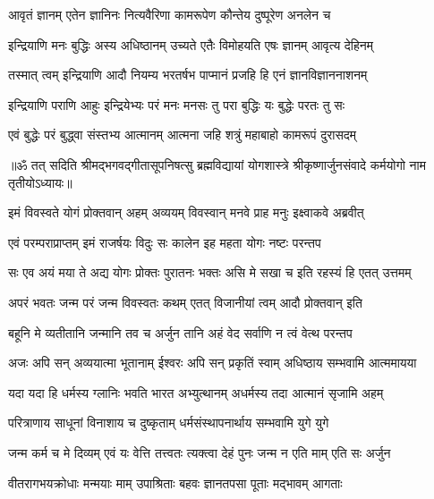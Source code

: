 \twolineshloka
{आवृतं ज्ञानम् एतेन ज्ञानिनः नित्यवैरिणा}
{कामरूपेण कौन्तेय दुष्पूरेण अनलेन च}%

\twolineshloka
{इन्द्रियाणि मनः बुद्धिः अस्य अधिष्ठानम् उच्यते}
{एतैः विमोहयति एषः ज्ञानम् आवृत्य देहिनम्}%

\twolineshloka
{तस्मात् त्वम् इन्द्रियाणि आदौ नियम्य भरतर्षभ}
{पाप्मानं प्रजहि हि एनं ज्ञानविज्ञाननाशनम्}%

\twolineshloka
{इन्द्रियाणि पराणि आहुः इन्द्रियेभ्यः परं मनः}
{मनसः तु परा बुद्धिः यः बुद्धेः परतः तु सः}%

\twolineshloka
{एवं बुद्धेः परं बुद्ध्वा संस्तभ्य आत्मानम् आत्मना}
{जहि शत्रुं महाबाहो कामरूपं दुरासदम्}%

{॥ॐ तत् सदिति श्रीमद्भगवद्गीतासूपनिषत्सु ब्रह्मविद्यायां योगशास्त्रे श्रीकृष्णार्जुनसंवादे कर्मयोगो नाम तृतीयोऽध्यायः॥}



\twolineshloka
{इमं विवस्वते योगं प्रोक्तवान् अहम् अव्ययम्}
{विवस्वान् मनवे प्राह मनुः इक्ष्वाकवे अब्रवीत्}%

\twolineshloka
{एवं परम्पराप्राप्तम् इमं राजर्षयः विदुः}
{सः कालेन इह महता योगः नष्टः परन्तप}%

\twolineshloka
{सः एव अयं मया ते अद्य योगः प्रोक्तः पुरातनः}
{भक्तः असि मे सखा च इति रहस्यं हि एतत् उत्तमम्}%


\twolineshloka
{अपरं भवतः जन्म परं जन्म विवस्वतः}
{कथम् एतत् विजानीयां त्वम् आदौ प्रोक्तवान् इति}%


\twolineshloka
{बहूनि मे व्यतीतानि जन्मानि तव च अर्जुन}
{तानि अहं वेद सर्वाणि न त्वं वेत्थ परन्तप}%

\twolineshloka
{अजः अपि सन् अव्ययात्मा भूतानाम् ईश्वरः अपि सन्}
{प्रकृतिं स्वाम् अधिष्ठाय सम्भवामि आत्ममायया}%

\twolineshloka
{यदा यदा हि धर्मस्य ग्लानिः भवति भारत}
{अभ्युत्थानम् अधर्मस्य तदा आत्मानं सृजामि अहम्}%

\twolineshloka
{परित्राणाय साधूनां विनाशाय च दुष्कृताम्}
{धर्मसंस्थापनार्थाय सम्भवामि युगे युगे}%

\twolineshloka
{जन्म कर्म च मे दिव्यम् एवं यः वेत्ति तत्त्वतः}
{त्यक्त्वा देहं पुनः जन्म न एति माम् एति सः अर्जुन}%

\twolineshloka
{वीतरागभयक्रोधाः मन्मयाः माम् उपाश्रिताः}
{बहवः ज्ञानतपसा पूताः मद्भावम् आगताः}%

